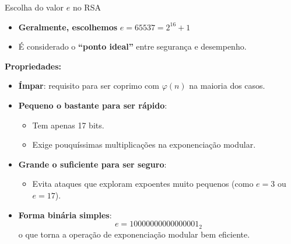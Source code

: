 \begin{frame}{Escolha do valor $e$ no RSA}
  \begin{itemize}
    \item \textbf{Geralmente, escolhemos} $e = 65537 = 2^{16} + 1$
    \item É considerado o \textbf{“ponto ideal”} entre segurança e desempenho.
  \end{itemize}

  \vspace{0.5em}
  \textbf{Propriedades:}
  \begin{itemize}
    \item \textbf{Ímpar}: requisito para ser coprimo com $\varphi(n)$ na maioria dos casos.
    \item \textbf{Pequeno o bastante para ser rápido}:
          \begin{itemize}
            \item Tem apenas 17 bits.
            \item Exige pouquíssimas multiplicações na exponenciação modular.
          \end{itemize}
    \item \textbf{Grande o suficiente para ser seguro}:
          \begin{itemize}
            \item Evita ataques que exploram expoentes muito pequenos (como $e = 3$ ou $e = 17$).
          \end{itemize}
    \item \textbf{Forma binária simples}:
          \[
            e = 10000000000000001_2
          \]
          o que torna a operação de exponenciação modular bem eficiente.
  \end{itemize}
\end{frame}


